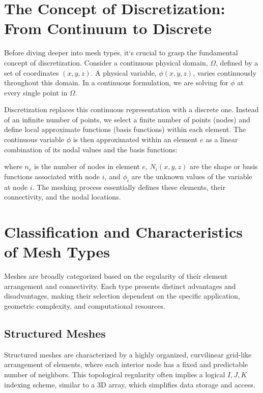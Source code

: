 \documentclass{book}
\begin{document}
\section{The Concept of Discretization: From Continuum to Discrete}

Before diving deeper into mesh types, it`s crucial to grasp the fundamental concept of discretization. Consider a continuous physical domain, $\Omega$, defined by a set of coordinates $(x,y,z)$. A physical variable, $\phi(x,y,z)$, varies continuously throughout this domain. In a continuous formulation, we are solving for $\phi$ at every single point in $\Omega$.

Discretization replaces this continuous representation with a discrete one. Instead of an infinite number of points, we select a finite number of points (nodes) and define local approximate functions (basis functions) within each element. The continuous variable $\phi$ is then approximated within an element $e$ as a linear combination of its nodal values and the basis functions:

where $n_e$ is the number of nodes in element $e$, $N_i(x,y,z)$ are the shape or basis functions associated with node $i$, and $\phi_i$ are the unknown values of the variable at node $i$. The meshing process essentially defines these elements, their connectivity, and the nodal locations.

\section{Classification and Characteristics of Mesh Types}

Meshes are broadly categorized based on the regularity of their element arrangement and connectivity. Each type presents distinct advantages and disadvantages, making their selection dependent on the specific application, geometric complexity, and computational resources.

\subsection{Structured Meshes}
Structured meshes are characterized by a highly organized, curvilinear grid-like arrangement of elements, where each interior node has a fixed and predictable number of neighbors. This topological regularity often implies a logical $I, J, K$ indexing scheme, similar to a 3D array, which simplifies data storage and access.
\end{document}
